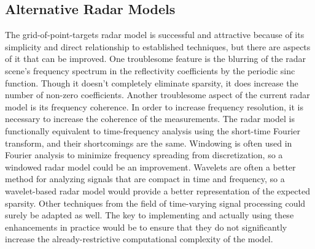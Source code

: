 \subsection{Alternative Radar Models}
The grid-of-point-targets radar model is successful and attractive because of its simplicity and direct relationship to established techniques, but there are aspects of it that can be improved. One troublesome feature is the blurring of the radar scene's frequency spectrum in the reflectivity coefficients by the periodic sinc function. Though it doesn't completely eliminate sparsity, it does increase the number of non-zero coefficients. Another troublesome aspect of the current radar model is its frequency coherence. In order to increase frequency resolution, it is necessary to increase the coherence of the measurements. The radar model is functionally equivalent to time-frequency analysis using the short-time Fourier transform, and their shortcomings are the same. Windowing is often used in Fourier analysis to minimize frequency spreading from discretization, so a windowed radar model could be an improvement. Wavelets are often a better method for analyzing signals that are compact in time and frequency, so a wavelet-based radar model would provide a better representation of the expected sparsity. Other techniques from the field of time-varying signal processing could surely be adapted as well. The key to implementing and actually using these enhancements in practice would be to ensure that they do not significantly increase the already-restrictive computational complexity of the model.

